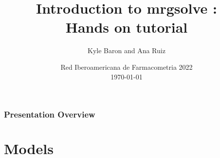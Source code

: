 \documentclass[
	11pt, %
]{beamer}
\title[RedIF 2022]{Introduction to mrgsolve :  \\Hands on tutorial} %
\author[Kyle Baron \and Ana Ruiz]{Kyle Baron and Ana Ruiz} %
\institute{Metrum Research Group and Gilead Sciences} %
\date[\today]{Red Iberoamericana de Farmacometria 2022 \\ \today} %
\begin{document}

\begin{frame}
	\titlepage %



\end{frame}






\begin{frame}
	\frametitle{Presentation Overview} %
	
	\tableofcontents %
\end{frame}


\section{Models} %
\end{document}
